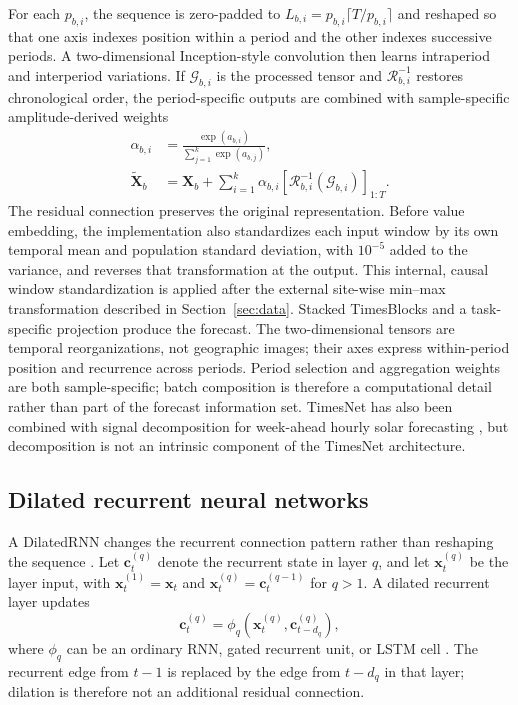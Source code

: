 For each $p_{b,i}$, the sequence is zero-padded to
$L_{b,i}=p_{b,i}\lceil T/p_{b,i}\rceil$ and reshaped so that one axis indexes
position within a period and the other indexes successive periods. A
two-dimensional Inception-style convolution then learns intraperiod and
interperiod variations. If $\mathcal{G}_{b,i}$ is the processed tensor and
$\mathcal{R}_{b,i}^{-1}$ restores chronological order, the period-specific
outputs are combined with sample-specific amplitude-derived weights
\begin{equation}
\begin{aligned}
  \alpha_{b,i}
  &=
  \frac{\exp(a_{b,i})}
       {\sum_{j=1}^{k}\exp(a_{b,j})},
  \\
  \widetilde{\mathbf{X}}_b
  &=
  \mathbf{X}_b
  +
  \sum_{i=1}^{k}
  \alpha_{b,i}
  \left[
    \mathcal{R}_{b,i}^{-1}(\mathcal{G}_{b,i})
  \right]_{1:T}.
\end{aligned}
  \label{eq:timesnet_aggregation}
\end{equation}
The residual connection preserves the original representation. Before value
embedding, the implementation also standardizes each input window by its own
temporal mean and population standard deviation, with $10^{-5}$ added to the
variance, and reverses that transformation at the output. This internal,
causal window standardization is applied after the external site-wise min--max
transformation described in Section~\ref{sec:data}. Stacked TimesBlocks and a
task-specific projection produce the forecast. The two-dimensional tensors are
temporal reorganizations, not geographic images; their axes express
within-period position and recurrence across periods. Period selection and
aggregation weights are both sample-specific; batch composition is therefore
a computational detail rather than part of the forecast information set.
TimesNet has also been combined with signal decomposition for week-ahead
hourly solar forecasting \cite{zhao2024timesnet}, but decomposition is not an
intrinsic component of the TimesNet architecture.

\subsection{Dilated recurrent neural networks}

A DilatedRNN changes the recurrent connection pattern rather than reshaping the
sequence \cite{chang2017}. Let $\mathbf{c}_{t}^{(q)}$ denote the recurrent
state in layer $q$, and let $\mathbf{x}_{t}^{(q)}$ be the layer input, with
$\mathbf{x}_{t}^{(1)}=\mathbf{x}_t$ and
$\mathbf{x}_{t}^{(q)}=\mathbf{c}_{t}^{(q-1)}$ for $q>1$. A dilated recurrent
layer updates
\begin{equation}
  \mathbf{c}_{t}^{(q)}
  =
  \phi_q\!\left(
    \mathbf{x}_{t}^{(q)},
    \mathbf{c}_{t-d_q}^{(q)}
  \right),
  \label{eq:dilated_rnn}
\end{equation}
where $\phi_q$ can be an ordinary RNN, gated recurrent unit, or LSTM cell
\cite{hochreiter1997}. The recurrent edge from $t-1$ is replaced by the edge
from $t-d_q$ in that layer; dilation is therefore not an additional residual
connection.


